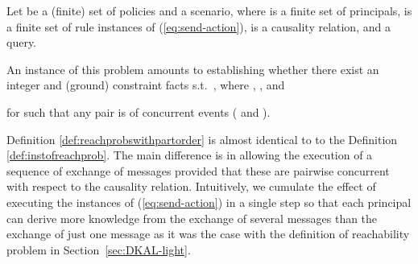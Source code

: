 \documentclass[conference]{llncs}
\begin{document}
{Let  be a (finite) set of policies and  a scenario, where  is a finite set of principals,  is a
finite set of rule instances of (\ref{eq:send-action}),  is
a causality relation, and  a query.  



\begin{definition}
  \label{def:reachprobswithpartorder}
An instance of this problem 
amounts to establishing whether there exist an integer  and (ground) constraint facts
  s.t.~,
where ,
, and

for  such that any pair  is of
concurrent events ( and ).
\end{definition}


Definition \ref{def:reachprobswithpartorder} is
almost identical to to the Definition \ref{def:instofreachprob}. The main
difference is in allowing the execution of a sequence 
of exchange of messages provided that these are pairwise concurrent
with respect to the causality relation.  Intuitively, we cumulate the
effect of executing the instances  of
(\ref{eq:send-action}) in a single step so that each principal can
derive more knowledge from the exchange of several messages than the
exchange of just one message as it was the case with the definition of
reachability problem in Section~\ref{sec:DKAL-light}.

}
\end{document}
